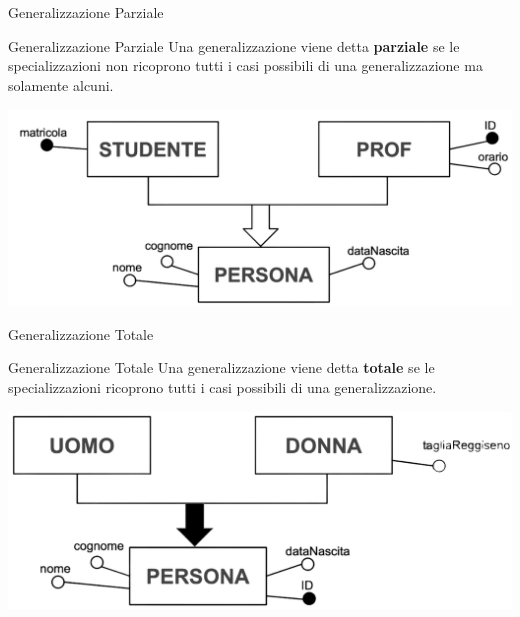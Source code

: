 \begin{frame}{Generalizzazione Parziale}
\begin{minipage}{.9\textwidth}
    \begin{block}{Generalizzazione Parziale}
        Una generalizzazione viene detta \textbf{parziale} se le specializzazioni non ricoprono tutti i casi possibili di una generalizzazione ma solamente alcuni.
    \end{block}
\end{minipage}
\begin{center}
    \includegraphics[width=.8\textwidth]{sections/er-model/img/generalization2.png}
\end{center}
\end{frame}
%
\begin{frame}{Generalizzazione Totale}
\begin{minipage}{.9\textwidth}
    \begin{block}{Generalizzazione Totale}
        Una generalizzazione viene detta \textbf{totale} se le specializzazioni ricoprono tutti i casi possibili di una generalizzazione.
    \end{block}
\end{minipage}
\begin{center}
    \includegraphics[width=.8\textwidth]{sections/er-model/img/generalization4.png}
\end{center}
\end{frame}
%
